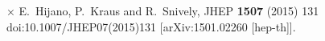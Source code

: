 \begin{thebibliography}{}
 ×%
  E.~Hijano, P.~Kraus and R.~Snively,
  JHEP {\bf 1507} (2015) 131
  doi:10.1007/JHEP07(2015)131
  [arXiv:1501.02260 [hep-th]].

\end{thebibliography}
